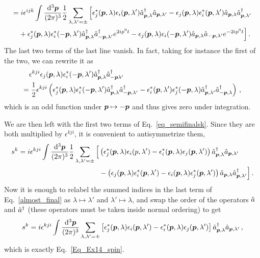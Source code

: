 \begin{sol}
\begin{equation}
\begin{split}
            = &\;  i \epsilon^{ijk} \int \frac{{\rm d}^3\boldsymbol{p}}{(2\pi)^{3}} \frac{1}{2}\sum_{\lambda, \lambda'=\pm}\Big[\epsilon^*_{j}(\boldsymbol{p},\lambda)\epsilon_{i}(\boldsymbol{p}, \lambda')\hat{a}^\dagger_{\boldsymbol{p},\lambda}\hat{a}_{\boldsymbol{p}, \lambda'} - \epsilon_{j}(\boldsymbol{p},\lambda)\epsilon^*_{i}(\boldsymbol{p}, \lambda')\hat{a}_{\boldsymbol{p}, \lambda}\hat{a}^\dagger_{\boldsymbol{p}, \lambda'} \\
            & + \epsilon^*_{j}(\boldsymbol{p},\lambda)\epsilon^*_{i}(-\boldsymbol{p}, \lambda')\hat{a}^\dagger_{\boldsymbol{p},\lambda}\hat{a}^\dagger_{-\boldsymbol{p}, \lambda'}e^{2ip^{0}t} - \epsilon_{j}(\boldsymbol{p},\lambda)\epsilon_{i}(-\boldsymbol{p}, \lambda')\hat{a}_{\boldsymbol{p},\lambda}\hat{a}_{-\boldsymbol{p}, \lambda'}e^{-2ip^{0}t}\Big]\, .
    \end{split}
    \end{equation}
    The last two terms of the last line vanish. In fact, taking for instance the first of the two, we can rewrite it as
    \begin{equation}
    \begin{split}
        & \epsilon^{kji} \epsilon_{j}(\boldsymbol{p},\lambda)\epsilon^*_{i}(-\boldsymbol{p}, \lambda')\hat{a}^\dagger_{\boldsymbol{p}, \lambda}\hat{a}^\dagger_{-\boldsymbol{p} \lambda'}  \\
        = &\; \frac{1}{2}\epsilon^{kji}\left(\epsilon^*_{j}(\boldsymbol{p},\lambda)\epsilon^*_{i}(-\boldsymbol{p}, \lambda')\hat{a}^\dagger_{\boldsymbol{p},\lambda}\hat{a}^\dagger_{-\boldsymbol{p},\lambda'}
        - \epsilon^*_{i}(\boldsymbol{p},\lambda')\epsilon^*_{j}(-\boldsymbol{p}, \lambda)\hat{a}^\dagger_{\boldsymbol{p}, \lambda'}\hat{a}^\dagger_{-\boldsymbol{p}, \lambda}\right)\,,
    \end{split}
    \end{equation}
    which is an odd function under $\boldsymbol{p} \mapsto - \boldsymbol{p}$ and thus gives zero under integration. \par 
    We are then left with the first two terms of Eq.~\ref{eq_semifinalsk}. Since they are both multiplied by $\epsilon^{kji}$, it is convenient to antisymmetrize them,
    \begin{equation}
    \label{almost_final}
    \begin{split}
        s^{k} = i\epsilon^{kji} \int \frac{{\rm d}^3\boldsymbol{p}}{(2\pi)^{3}}\frac{1}{2}\sum_{\lambda, \lambda'=\pm}\Big[&\left(\epsilon^*_{j}(\boldsymbol{p},\lambda)\epsilon_{i}(p, \lambda') - \epsilon^*_{i}(\boldsymbol{p},\lambda)\epsilon_{j}(\boldsymbol{p}, \lambda')\right)\hat{a}^\dagger_{\boldsymbol{p}, \lambda}\hat{a}_{\boldsymbol{p}, \lambda'} \\
        &- \left(\epsilon_{j}(\boldsymbol{p},\lambda)\epsilon^*_{i}(\boldsymbol{p}, \lambda') - \epsilon_{i}(\boldsymbol{p},\lambda)\epsilon^*_{j}(\boldsymbol{p}, \lambda')\right)\hat{a}_{\boldsymbol{p},\lambda}\hat{a}^\dagger_{\boldsymbol{p}, \lambda'}\Big]\, .
    \end{split}
    \end{equation}
    Now it is enough to relabel the summed indices in the last term of Eq.~\eqref{almost_final} as $\lambda \mapsto \lambda'$ and $\lambda' \mapsto \lambda$, and swap the order of the operators $\hat{a}$ and $\hat{a}^\dagger$ (these operators must be taken inside normal ordering) to get 
    \begin{equation}
        s^{k} = i \epsilon^{kji} \int \frac{{\rm d}^3\boldsymbol{p}}{(2\pi)^{3}}\sum_{\lambda ,\lambda'=\pm}\left[\epsilon^*_{j}(\boldsymbol{p},\lambda)\epsilon_{i}(\boldsymbol{p}, \lambda') - \epsilon^*_{i}(\boldsymbol{p},\lambda)\epsilon_{j}(\boldsymbol{p}, \lambda')\right]\hat{a}^\dagger_{\boldsymbol{p},\lambda}\hat{a}_{\boldsymbol{p}, \lambda'} \,,
    \end{equation}
    which is exactly Eq.~\eqref{Eq_Ex14_spin}.
\end{sol}